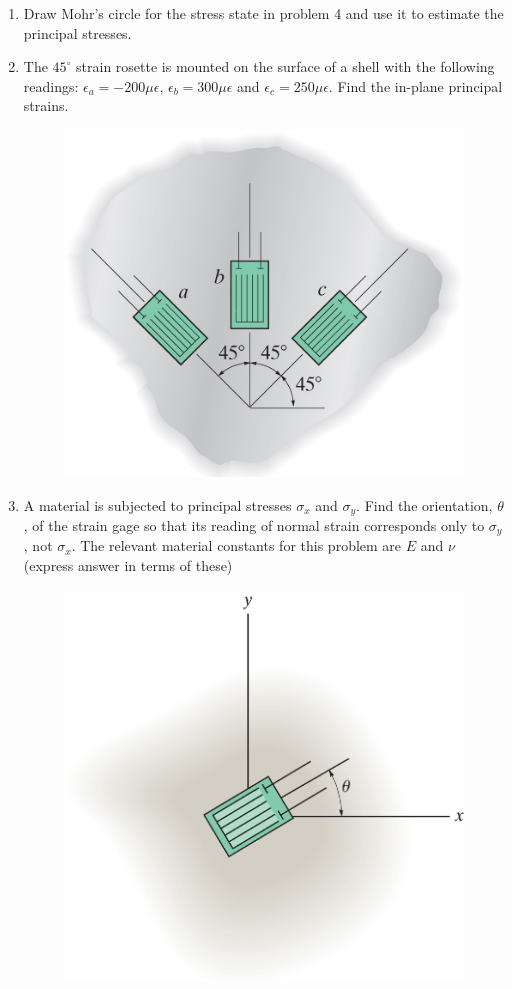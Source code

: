 \documentclass[12pt, oneside]{article}
\begin{document}
\begin{enumerate}
	\item Draw Mohr's circle for the stress state in problem 4 and use it to estimate the principal stresses.

	\item %
		The $45^\circ$ strain rosette is mounted on the surface of a shell with the following readings: $\epsilon_a = -200 \mu \epsilon$, $\epsilon_b = 300 \mu \epsilon$ and $\epsilon_c = 250 \mu \epsilon$.
		Find the in-plane principal strains.
		\begin{figure}[H]
			\centering
			\includegraphics[width=0.6\linewidth]{10-25}
		\end{figure}
		\newpage

	\item %
		A material is subjected to principal stresses $\sigma_x$ and $\sigma_y$.
		Find the orientation, $\theta$, of the strain gage so that its reading of normal strain corresponds only to $\sigma_y$, not $\sigma_x$.
		The relevant material constants for this problem are $E$ and $\nu$ (express answer in terms of these)
		\begin{figure}[H]
			\centering
			\includegraphics[width=0.6\linewidth]{10-45}
		\end{figure}

\end{enumerate}
\end{document}
